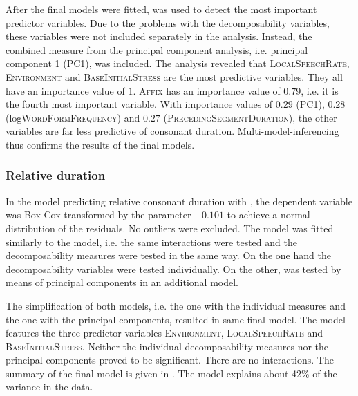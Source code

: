 After the final models were fitted,   was used to detect the most important predictor variables. Due to the  problems with the decomposability variables, these variables were not included separately in the analysis. Instead, the combined  measure from the principal component analysis, i.e. principal component 1 (\textsc{PC1}), was included.
The analysis revealed that \textsc{LocalSpeechRate}, \textsc{Environment} and \textsc{BaseInitialStress} are the most predictive variables. They all have an importance value of $1$. \textsc{Affix} has an importance value of $0.79$, i.e. it is the fourth most important variable. With importance values of $0.29$ (\textsc{PC1}), $0.28$ (log\textsc{WordFormFrequency}) and $0.27$ (\textsc{PrecedingSegmentDuration}), the other variables are far less predictive of consonant duration. Multi-model-inferencing thus confirms the results of the final models.


\subsubsection{Relative duration}

In the model predicting relative consonant duration with , the dependent variable was Box-Cox-transformed by the parameter $-0.101$ to achieve a normal distribution of the residuals. No outliers were excluded. The model was fitted similarly to the  model, i.e. the same interactions were tested and the decomposability measures were tested in the same way. On the one hand the decomposability variables were tested individually. On the other,  was tested by means of principal components in an additional model. 

The simplification of both models, i.e. the one with the individual measures and the one with the principal components, resulted in same final model. The model features the three predictor variables \textsc{Environment}, \textsc{LocalSpeechRate} and \textsc{BaseInitialStress}. Neither the individual decomposability measures nor the principal components proved to be significant. There are no interactions. 
The summary of the final model is given in . The model explains about 42\% of the variance in the data.\\





